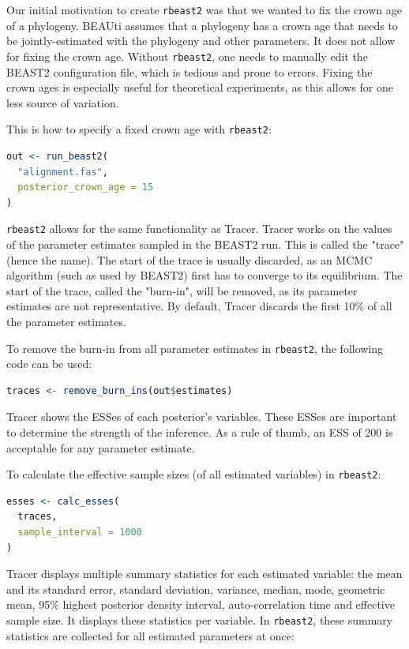 \documentclass{article}
\begin{document}
Our initial motivation to create \verb;rbeast2; 
was that we wanted to fix the crown age of a phylogeny.
BEAUti assumes that a phylogeny has a crown age that needs to be jointly-estimated
with the phylogeny and other parameters. It does not allow for fixing
the crown age. Without \verb;rbeast2;, one needs to manually edit the BEAST2 
configuration file, which is tedious and prone to errors. 
Fixing the crown ages is especially useful for theoretical experiments,
as this allows for one less source of variation.

This is how to specify a fixed crown age with \verb;rbeast2;:

\begin{lstlisting}[language=R, floatplacement=H]
out <- run_beast2(
  "alignment.fas",
  posterior_crown_age = 15
)
\end{lstlisting}

\verb;rbeast2; allows for the same functionality as Tracer.
Tracer works on the values of the parameter estimates sampled
in the BEAST2 run. This is called the "trace" (hence the name).
The start of the trace is usually discarded, as an MCMC 
algorithm (such as used by BEAST2) first has to converge to
its equilibrium. The start of the trace, called the "burn-in", 
will be removed, as its parameter estimates are not 
representative. By default, Tracer discards the first 10\% of all 
the parameter estimates. 

To remove the burn-in from all parameter estimates in \verb;rbeast2;,
the following code can be used:

\begin{lstlisting}[language=R, floatplacement=H]
traces <- remove_burn_ins(out$estimates)
\end{lstlisting}

Tracer shows the ESSes of each posterior's variables.
These ESSes are important to determine the strength of the
inference. As a rule of thumb, an ESS of 200 is acceptable 
for any parameter estimate.

To calculate the effective sample sizes (of all estimated variables) in \verb;rbeast2;:

\begin{lstlisting}[language=R, floatplacement=H]
esses <- calc_esses(
  traces, 
  sample_interval = 1000
)
\end{lstlisting}

Tracer displays multiple summary statistics for each
estimated variable: the mean and its standard error, standard deviation,
variance, median, mode, geometric mean, 95\% highest posterior density interval, 
auto-correlation time and effective sample size. It displays these statistics per
variable. In \verb;rbeast2;, these summary statistics are collected for
all estimated parameters at once: 
\end{document}
